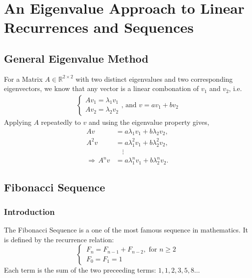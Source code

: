 \documentclass[11pt]{article}
\begin{document}
\begin{center}
    \tableofcontents
\end{center}
\setcounter{page}{1}
\newpage
\section{An Eigenvalue Approach to Linear Recurrences and Sequences}
\subsection{General Eigenvalue Method}
For a Matrix $A \in \mathbb{R}^{2\times 2}$ with two distinct eigenvalues and two corresponding eigenvectors, we know that any vector is a linear combonation of $v_1$ and $v_2$, i.e.
\begin{align*}
    \begin{cases}
        Av_1=\lambda_1 v_1\\
        Av_2=\lambda_2 v_2
    \end{cases}\text{, and }
    v=av_1+bv_2
\end{align*}
Applying $A$ repeatedly to $v$ and using the eigenvalue property gives, 
\begin{align*}
    Av &=a\lambda_1 v_1+b\lambda_2 v_2, \\
    A^2v &= a\lambda_1^2 v_1+b\lambda_2^2 v_2, \\
    &\quad\vdots \\
    \Rightarrow\, A^nv&=a\lambda_1^n v_1+b\lambda_2^n v_2.
\end{align*}
\subsection{Fibonacci Sequence}
\subsubsection{Introduction}
The Fibonacci Sequence is a one of the most famous sequence in mathematics. It is defined by the recurrence relation:
\[
    \begin{cases}
        \,F_n=F_{n-1}+F_{n-2},\text{ for }n \ge 2\\[.5em]
        \,F_0=F_1=1
    \end{cases}    
\]
Each term is the sum of the two preceeding terms: $1,1,2,3,5,8\dots$
\end{document}
